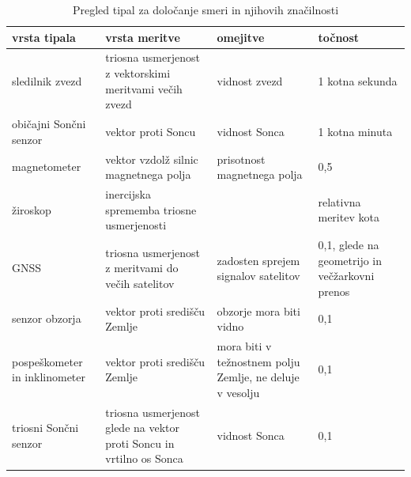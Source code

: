 %
%


\begin{table}
	\centering
	\caption{Pregled tipal za določanje smeri in njihovih značilnosti}
	\label{tabKomp}       %
    \resizebox{11cm}{!} 
{
\begin{tabular}{|p{3cm}|p{4cm}|p{}|p{3cm}|}
	\hline 
	vrsta tipala & vrsta meritve & omejitve & točnost \\ 
	\hline 
	sledilnik zvezd & triosna usmerjenost z vektorskimi meritvami večih zvezd & vidnost zvezd & 1 kotna sekunda \\ 
	\hline 
	običajni Sončni senzor & vektor proti Soncu & vidnost Sonca & 1 kotna minuta \\ 
	\hline 
	magnetometer & vektor vzdolž silnic magnetnega polja & prisotnost magnetnega polja & 0,5\degree \\ 
	\hline 
	žiroskop & inercijska sprememba triosne usmerjenosti &  & relativna meritev kota \\ 
	\hline 
	GNSS & triosna usmerjenost z meritvami do večih satelitov & zadosten sprejem signalov satelitov & 0,1\degree, glede na geometrijo in večžarkovni prenos \\ 
	\hline 
	senzor obzorja & vektor proti središču Zemlje & obzorje mora biti vidno & 0,1\degree \\ 
	\hline 
	pospeškometer in inklinometer & vektor proti središču Zemlje & mora biti v težnostnem polju Zemlje, ne deluje v vesolju & 0,1\degree \\ 
	\hline 
	triosni Sončni senzor  & triosna usmerjenost glede na vektor proti Soncu in vrtilno os Sonca & vidnost Sonca & 0,1\degree \\ 
	\hline 
\end{tabular} 
}
\end{table}

